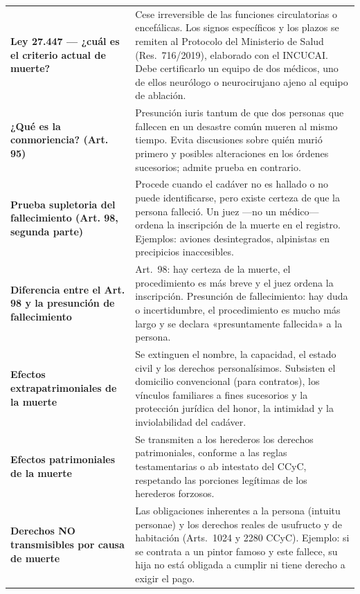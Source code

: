 \documentclass[12pt,oneside]{book}
\begin{document}
\begin{longtable}{
    >{\raggedright\arraybackslash}p{}
    >{\raggedright\arraybackslash}p{}
}
\textbf{Ley 27.447 --- ¿cuál es el criterio actual de muerte?} &
Cese irreversible de las funciones circulatorias o encefálicas. Los signos específicos y los plazos se remiten al Protocolo del Ministerio de Salud (Res.\ 716/2019), elaborado con el INCUCAI. Debe certificarlo un equipo de dos médicos, uno de ellos neurólogo o neurocirujano ajeno al equipo de ablación. \\

\textbf{¿Qué es la conmoriencia? (Art. 95)} &
Presunción iuris tantum de que dos personas que fallecen en un desastre común mueren al mismo tiempo. Evita discusiones sobre quién murió primero y posibles alteraciones en los órdenes sucesorios; admite prueba en contrario. \\

\textbf{Prueba supletoria del fallecimiento (Art. 98, segunda parte)} &
Procede cuando el cadáver no es hallado o no puede identificarse, pero existe certeza de que la persona falleció. Un juez ---no un médico--- ordena la inscripción de la muerte en el registro. Ejemplos: aviones desintegrados, alpinistas en precipicios inaccesibles. \\

\textbf{Diferencia entre el Art. 98 y la presunción de fallecimiento} &
Art.\ 98: hay certeza de la muerte, el procedimiento es más breve y el juez ordena la inscripción. Presunción de fallecimiento: hay duda o incertidumbre, el procedimiento es mucho más largo y se declara «presuntamente fallecida» a la persona. \\

\textbf{Efectos extrapatrimoniales de la muerte} &
Se extinguen el nombre, la capacidad, el estado civil y los derechos personalísimos. Subsisten el domicilio convencional (para contratos), los vínculos familiares a fines sucesorios y la protección jurídica del honor, la intimidad y la inviolabilidad del cadáver. \\

\textbf{Efectos patrimoniales de la muerte} &
Se transmiten a los herederos los derechos patrimoniales, conforme a las reglas testamentarias o ab intestato del CCyC, respetando las porciones legítimas de los herederos forzosos. \\

\textbf{Derechos NO transmisibles por causa de muerte} &
Las obligaciones inherentes a la persona (intuitu personae) y los derechos reales de usufructo y de habitación (Arts.\ 1024 y 2280 CCyC). Ejemplo: si se contrata a un pintor famoso y este fallece, su hija no está obligada a cumplir ni tiene derecho a exigir el pago. \\


\end{longtable}
\end{document}
